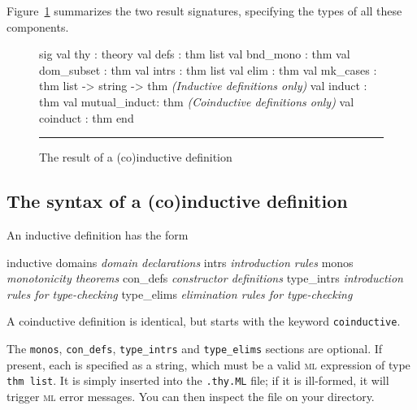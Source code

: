\documentclass[12pt]{article}
\begin{document}
Figure~\ref{def-result-fig} summarizes the two result signatures,
specifying the types of all these components.

\begin{figure}
\begin{ttbox}
sig
val thy          : theory
val defs         : thm list
val bnd_mono     : thm
val dom_subset   : thm
val intrs        : thm list
val elim         : thm
val mk_cases     : thm list -> string -> thm
{\it(Inductive definitions only)} 
val induct       : thm
val mutual_induct: thm
{\it(Coinductive definitions only)}
val coinduct    : thm
end
\end{ttbox}
\hrule
\caption{The result of a (co)inductive definition} \label{def-result-fig}
\end{figure}

\subsection{The syntax of a (co)inductive definition}
An inductive definition has the form
\begin{ttbox}
inductive
  domains    {\it domain declarations}
  intrs      {\it introduction rules}
  monos      {\it monotonicity theorems}
  con_defs   {\it constructor definitions}
  type_intrs {\it introduction rules for type-checking}
  type_elims {\it elimination rules for type-checking}
\end{ttbox}
A coinductive definition is identical, but starts with the keyword
{\tt coinductive}.  

The {\tt monos}, {\tt con\_defs}, {\tt type\_intrs} and {\tt type\_elims}
sections are optional.  If present, each is specified as a string, which
must be a valid \textsc{ml} expression of type {\tt thm list}.  It is simply
inserted into the {\tt .thy.ML} file; if it is ill-formed, it will trigger
\textsc{ml} error messages.  You can then inspect the file on your directory.
\end{document}
